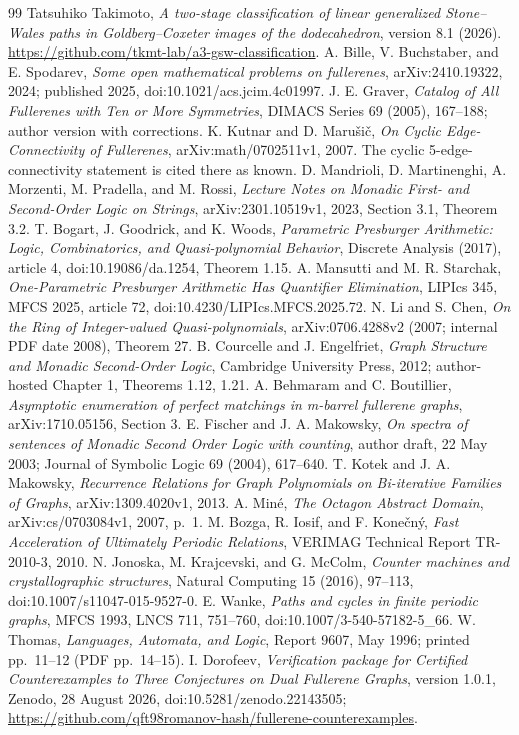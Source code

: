 \documentclass[11pt]{amsart}
\theoremstyle{definition}\newtheorem{definition}{Definition}
\begin{document}
\clearpage
\begin{thebibliography}{99}
 Tatsuhiko Takimoto,
\emph{A two-stage classification of linear generalized Stone--Wales paths in
Goldberg--Coxeter images of the dodecahedron}, version 8.1 (2026).
{\url{https://github.com/tkmt-lab/a3-gsw-classification}}.
 A. Bille, V. Buchstaber, and E. Spodarev,
\emph{Some open mathematical problems on fullerenes}, arXiv:2410.19322,
2024; published 2025, doi:10.1021/acs.jcim.4c01997.
 J. E. Graver,
\emph{Catalog of All Fullerenes with Ten or More Symmetries},
DIMACS Series 69 (2005), 167--188; author version with corrections.
 K. Kutnar and D. Maru\v{s}i\v{c},
\emph{On Cyclic Edge-Connectivity of Fullerenes}, arXiv:math/0702511v1,
2007. The cyclic 5-edge-connectivity statement is cited there as known.
 D. Mandrioli, D. Martinenghi, A. Morzenti,
M. Pradella, and M. Rossi,
\emph{Lecture Notes on Monadic First- and Second-Order Logic on Strings},
arXiv:2301.10519v1, 2023, Section 3.1, Theorem 3.2.
 T. Bogart, J. Goodrick, and K. Woods,
\emph{Parametric Presburger Arithmetic: Logic, Combinatorics, and
Quasi-polynomial Behavior}, Discrete Analysis (2017), article 4,
doi:10.19086/da.1254, Theorem 1.15.
 A. Mansutti and M. R. Starchak,
\emph{One-Parametric Presburger Arithmetic Has Quantifier Elimination},
LIPIcs 345, MFCS 2025, article 72, doi:10.4230/LIPIcs.MFCS.2025.72.
 N. Li and S. Chen,
\emph{On the Ring of Integer-valued Quasi-polynomials},
arXiv:0706.4288v2 (2007; internal PDF date 2008), Theorem 27.
 B. Courcelle and J. Engelfriet,
\emph{Graph Structure and Monadic Second-Order Logic}, Cambridge
University Press, 2012; author-hosted Chapter 1, Theorems 1.12, 1.21.
 A. Behmaram and C. Boutillier,
\emph{Asymptotic enumeration of perfect matchings in m-barrel fullerene graphs},
arXiv:1710.05156, Section 3.
 E. Fischer and J. A. Makowsky,
\emph{On spectra of sentences of Monadic Second Order Logic with counting},
author draft, 22 May 2003; Journal of Symbolic Logic 69 (2004), 617--640.
 T. Kotek and J. A. Makowsky,
\emph{Recurrence Relations for Graph Polynomials on Bi-iterative
Families of Graphs}, arXiv:1309.4020v1, 2013.
 A. Min\'e, \emph{The Octagon Abstract Domain},
arXiv:cs/0703084v1, 2007, p.~1.
 M. Bozga, R. Iosif, and F. Kone\v{c}n\'y,
\emph{Fast Acceleration of Ultimately Periodic Relations},
VERIMAG Technical Report TR-2010-3, 2010.
 N. Jonoska, M. Krajcevski, and G. McColm,
\emph{Counter machines and crystallographic structures},
Natural Computing 15 (2016), 97--113,
doi:10.1007/s11047-015-9527-0.
 E. Wanke, \emph{Paths and cycles in finite periodic graphs},
MFCS 1993, LNCS 711, 751--760,
doi:10.1007/3-540-57182-5\_66.
 W. Thomas, \emph{Languages, Automata, and Logic},
Report 9607, May 1996; printed pp.~11--12 (PDF pp.~14--15).
 I. Dorofeev, \emph{Verification package for Certified
Counterexamples to Three Conjectures on Dual Fullerene Graphs}, version 1.0.1,
Zenodo, 28 August 2026, doi:10.5281/zenodo.22143505;
{\url{https://github.com/qft98romanov-hash/fullerene-counterexamples}}.
\end{thebibliography}
\end{document}
